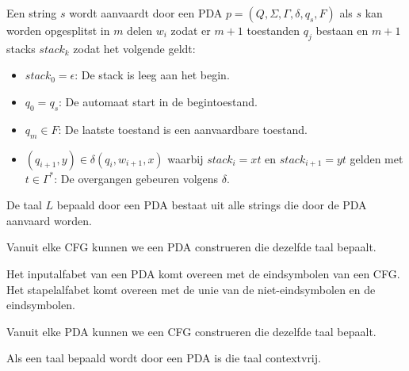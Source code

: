 \documentclass[main.tex]{subfiles}
\begin{document}
\begin{de}
  Een string $s$ wordt aanvaardt door een PDA $p = (Q,\Sigma,\Gamma,\delta,q_{s},F)$ als $s$ kan worden opgesplitst in $m$ delen $w_{i}$ zodat er $m+1$ toestanden $q_{j}$ bestaan en $m+1$ stacks $stack_{k}$ zodat het volgende geldt:
  \begin{itemize}
  \item $stack_{0} = \epsilon$: De stack is leeg aan het begin.
  \item $q_{0} = q_{s}$: De automaat start in de begintoestand.
  \item $q_{m} \in F$: De laatste toestand is een aanvaardbare toestand.
  \item $(q_{i+1}, y) \in \delta(q_{i}, w_{i+1}, x)$ waarbij $stack_{i} = xt$ en $stack_{i+1} = yt$ gelden met $t\in \Gamma^{*}$: De overgangen gebeuren volgens $\delta$.
  \end{itemize}
\end{de}

\begin{de}
  De taal $L$ bepaald door een PDA bestaat uit alle strings die door de PDA aanvaard worden.
\end{de}

\begin{lem}
  \label{lem:cfg-naar-pda}
  Vanuit elke CFG kunnen we een PDA construeren die dezelfde taal bepaalt.
\end{lem}

\begin{opm}
  Het inputalfabet van een PDA komt overeen met de eindsymbolen van een CFG.
  Het stapelalfabet komt overeen met de unie van de niet-eindsymbolen en de eindsymbolen.
\end{opm}

\begin{lem}
  \label{lem:pda-naar-cfg}
 Vanuit elke PDA kunnen we een CFG construeren die dezelfde taal bepaalt. 
\end{lem}

\begin{gev}
  \label{taal-pda-contextvrij}
  Als een taal bepaald wordt door een PDA is die taal contextvrij.
\end{gev}
\end{document}
